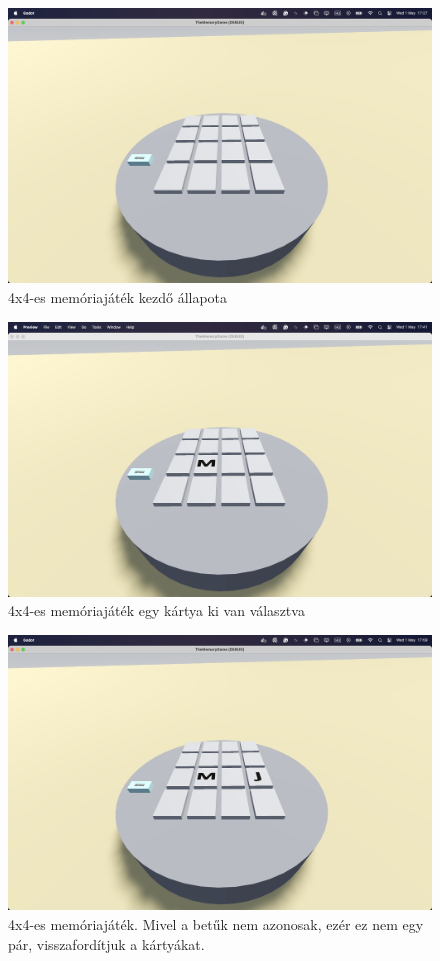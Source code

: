 \begin{figure}
    \includegraphics[width=\textwidth]{img/asztal_4x4.png}
    \caption{4x4-es memóriajáték kezdő állapota}
    \label{img:asztal}
\end{figure}
\begin{figure}
    \includegraphics[width=\textwidth]{img/asztal_4x4_card_flipped.png}
    \caption{4x4-es memóriajáték egy kártya ki van választva}
    \label{img:kartya_fliped}
\end{figure}
\begin{figure}
    \includegraphics[width=\textwidth]{img/asztal_4x4_non_pair.png}
    \caption{4x4-es memóriajáték. Mivel a betűk nem azonosak, ezér ez nem egy pár, visszafordítjuk a kártyákat.}
    \label{img:non_pair}
\end{figure}